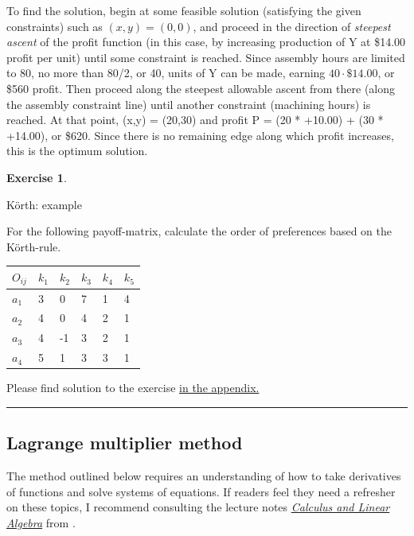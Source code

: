 \documentclass[
  12pt,
  oneside]{book}
\theoremstyle{definition}
\theoremstyle{definition}
\theoremstyle{definition}
\newtheorem{exercise}{Exercise}[chapter]
\theoremstyle{definition}
\theoremstyle{remark}
\begin{document}
To find the solution, begin at some feasible solution (satisfying the given constraints) such as \((x,y) = (0,0)\), and proceed in the direction of \emph{steepest ascent} of the profit function (in this case, by increasing production of Y at \$14.00 profit per unit) until some constraint is reached. Since assembly hours are limited to 80, no more than 80/2, or 40, units of Y can be made, earning \(40 \cdot \$14.00\), or \$560 profit. Then proceed along the steepest allowable ascent from there (along the assembly constraint line) until another constraint (machining hours) is reached. At that point, (x,y) = (20,30) and profit P = (20 * +10.00) + (30 * +14.00), or \$620. Since there is no remaining edge along which profit increases, this is the optimum solution.

\begin{exercise}
\protect\hypertarget{exr:koerth-example}{}\label{exr:koerth-example}

Körth: example

For the following payoff-matrix, calculate the order of preferences based on the Körth-rule.

\begin{longtable}[]{@{}llllll@{}}
\toprule\noalign{}
\(O_{ij}\) & \(k_1\) & \(k_2\) & \(k_3\) & \(k_4\) & \(k_5\) \\
\midrule\noalign{}
\endhead
\bottomrule\noalign{}
\endlastfoot
\(a_1\) & 3 & 0 & 7 & 1 & 4 \\
\(a_2\) & 4 & 0 & 4 & 2 & 1 \\
\(a_3\) & 4 & -1 & 3 & 2 & 1 \\
\(a_4\) & 5 & 1 & 3 & 3 & 1 \\
\end{longtable}

Please find solution to the exercise \protect\hyperlink{sol:koerth-example}{in the appendix.}

\begin{center}\rule{0.5\linewidth}{0.5pt}\end{center}

\end{exercise}

\hypertarget{lagrange-multiplier-method}{%
\subsection{Lagrange multiplier method}\label{lagrange-multiplier-method}}

The method outlined below requires an understanding of how to take derivatives of functions and solve systems of equations. If readers feel they need a refresher on these topics, I recommend consulting the lecture notes \href{https://raw.githubusercontent.com/hubchev/courses/main/pdfs/cla_A4.pdf}{\emph{Calculus and Linear Algebra}} from \citet{Huber2023Mathematics}.
\end{document}
